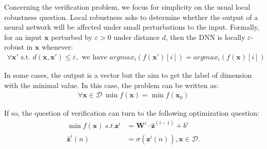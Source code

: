 \documentclass{llncs}
\newcommand{\vx}{\boldsymbol{x}}
\newcommand{\vb}{\boldsymbol{bias}}
\begin{document}
	
	
	\iffalse
	and the $i$-th hidden layer is a vector in $\mathbb{R}^{d_i}$, 
	and the output layer is a vector in $\mathbb{R}^{d'}$ or a scale. 
	The weights, bias and activation functions decide propagate the from previous to the next layer. In formula, from layer $l_{i-1}$ to layer $l_{i}$, the weight 
	$\boldsymbol{W}^i$ is matrix of $d_i\times d_{i-1}$, 
	the bias is a vector $\vb^i$ in $\mathbb{R}^{d_i}$, and the activation function 
	is $\sigma$, then  if the $i-1$-th layer is $\hat{\boldsymbol{z}}^{(i-1)}$, 
	then the value of $i$-th layer is computed by: 
	\begin{align*}
		{\boldsymbol{z}}^{i} &= \boldsymbol{W}^i\cdot \hat{\boldsymbol{z}}^{(i-1)}+ \vb^i\\
		\hat{\boldsymbol{z}}^{i}(n) &= \sigma({\boldsymbol{z}}^i(n)).
	\end{align*} The vector $\hat{\boldsymbol{z}}$ is called post-activation values, and $\boldsymbol{z}$ is called pre-activation values, and $\boldsymbol{z}^{(i)}_j$ is used to call the $j$-th neuron in the $i$-th layer. In our style, we also call neurons \emph{nodes} and use $a,b,c,d$ to denote them. We use $W_{ab}$ to denote the weight from neuron $b$ to $a$. We use $\boldsymbol{x}$ to denote the vector of input and  $f(\boldsymbol{x})$ to denote the output.
	\fi
	
	\medskip
	
	Concerning the verification problem, we focus for simplicity on the usual local robustness question. Local robustness asks to determine whether the output of a neural network will be affected under small perturbations to the input. 
	Formally, for an input $\vx$ perturbed by $\varepsilon >0$ under distance $d$, then the DNN is locally $\varepsilon$-robust in $\vx$ whenever:
	\begin{align*}
		\forall \boldsymbol{x'} \text{ s.t. } d(\vx,\vx')\leq \varepsilon, \text{ we have }  
		argmax_i (f(\boldsymbol{x'})[i]) = argmax_i(f(\boldsymbol{x})[i])
	\end{align*} 
	
	\iffalse
	In some cases, the output is a vector but the aim to get the label of dimension with the minimal value. In this case, the problem can be written as:\begin{align*}
		\forall \boldsymbol{x} \in\mathcal{D} \  \min f(\boldsymbol{x}) = \min f(\boldsymbol{x}_0)
	\end{align*}
	
	If so, the question of verification can turn to the following optimization question: \begin{align*}
		\min f(\boldsymbol{x}) \ s.t. {\boldsymbol{z}}^{i} &= \boldsymbol{W}^i\cdot \hat{\boldsymbol{z}}^{(i-1)}+ b^i\\
		\hat{\boldsymbol{z}}^{i}(n) &= \sigma({\boldsymbol{z}}^i(n)), \boldsymbol{x}\in\mathcal{D}.
	\end{align*}
	
\end{document}
